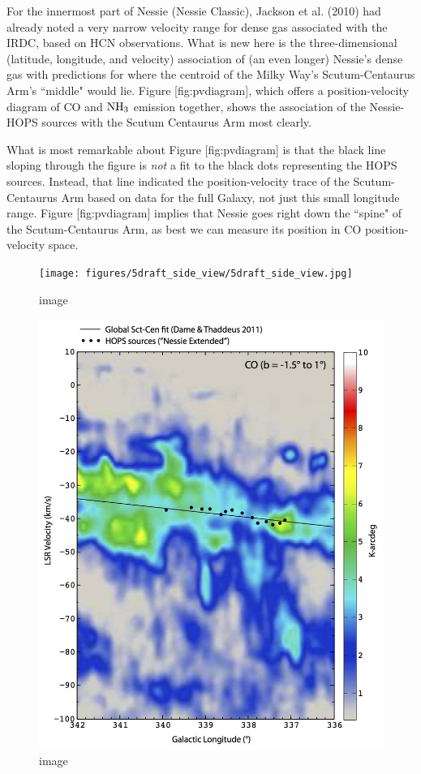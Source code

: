 \documentclass[]{article}
\makeatletter
\def\maxwidth{\ifdim\Gin@nat@width>\linewidth\linewidth
\else\Gin@nat@width\fi}
\let\Oldincludegraphics\includegraphics
\renewcommand{\includegraphics}[1]{\Oldincludegraphics[width=\maxwidth]{#1}}
\makeatother
\begin{document}
For the innermost part of Nessie (Nessie Classic), Jackson et al. (2010)
had already noted a very narrow velocity range for dense gas associated
with the IRDC, based on HCN observations. What is new here is the
three-dimensional (latitude, longitude, and velocity) association of (an
even longer) Nessie's dense gas with predictions for where the centroid
of the Milky Way's Scutum-Centaurus Arm's ``middle" would lie. Figure
{[}fig:pvdiagram{]}, which offers a position-velocity diagram of CO and
${\rm NH}_3$ emission together, shows the association of the Nessie-HOPS
sources with the Scutum Centaurus Arm most clearly.

What is most remarkable about Figure {[}fig:pvdiagram{]} is that the
black line sloping through the figure is \emph{not} a fit to the black
dots representing the HOPS sources. Instead, that line indicated the
position-velocity trace of the Scutum-Centaurus Arm based on
\citep{Dame2011} data for the full Galaxy, not just this small longitude
range. Figure {[}fig:pvdiagram{]} implies that Nessie goes right down
the ``spine" of the Scutum-Centaurus Arm, as best we can measure its
position in CO position-velocity space.

\begin{figure}[htbp]
\centering
\texttt{[image: figures/5draft\_side\_view/5draft\_side\_view.jpg]}
\caption{image}
\end{figure}

\begin{figure}[htbp]
\centering
\includegraphics{figures/7draftNessie_CO_lv/7draftNessie_CO_lv.jpg}
\caption{image}
\end{figure}
\end{document}
